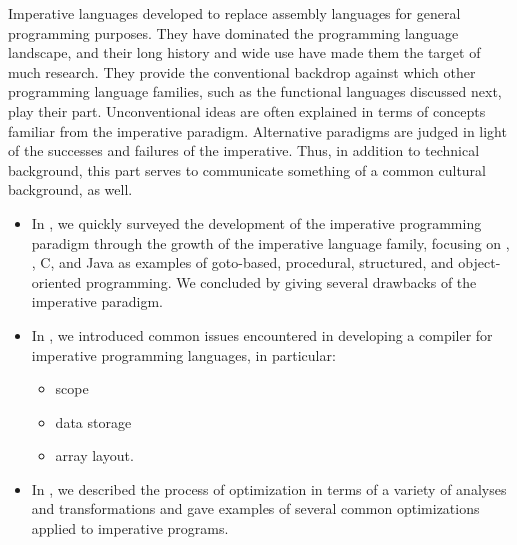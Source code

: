 \label{imperative:conclusion}
Imperative languages developed to replace assembly languages for general programming purposes. They have dominated the programming language landscape, and their long history and wide use have made them the target of much research. They provide the conventional backdrop against which other programming language families, such as the functional languages discussed next, play their part. Unconventional ideas are often explained in terms of concepts familiar from the imperative paradigm. Alternative paradigms are judged in light of the successes and failures of the imperative. Thus, in addition to technical background, this part serves to communicate something of a common cultural background, as well.
\begin{itemize}
\item In , we quickly surveyed the development of the imperative programming paradigm through the growth of the imperative language family, focusing on \Fortran, \Algol, C, and Java as examples of goto-based, procedural, structured, and object-oriented programming. We concluded by giving several drawbacks of the imperative paradigm.

\item In , we introduced common issues encountered in developing a compiler for imperative programming languages, in particular:
\begin{itemize}
\item scope
\item data storage
\item array layout.
\end{itemize}

\item In , we described the process of optimization in terms of a variety of analyses and transformations and gave examples of several common optimizations applied to imperative programs.
\end{itemize}

